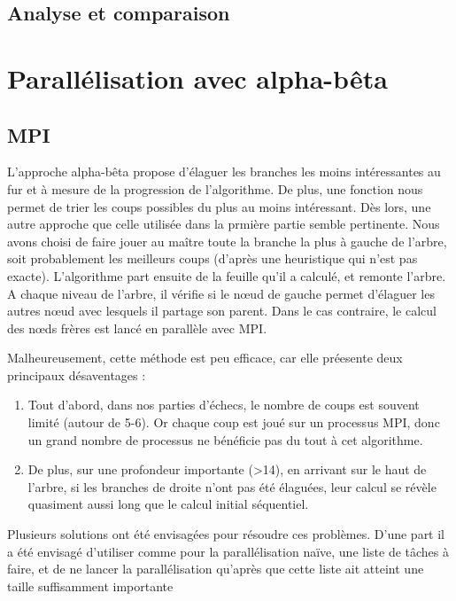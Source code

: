 \documentclass[12pt]{article}
\begin{document}
    \subsection{Analyse et comparaison}

\section{Parallélisation avec alpha-bêta}
    \subsection{MPI}
    L'approche alpha-bêta propose d'élaguer les branches
    les moins intéressantes au fur et à mesure de la progression de 
    l'algorithme. De plus, une fonction nous permet de trier les coups
    possibles du plus au moins intéressant. Dès lors, une autre 
    approche que celle utilisée dans la prmière partie semble pertinente.
    Nous avons choisi de faire jouer au
    maître toute la branche la plus à gauche de l'arbre, soit
    probablement les meilleurs coups (d'après une heuristique qui n'est pas 
    exacte). L'algorithme part ensuite de la feuille qu'il a calculé, et
    remonte l'arbre. A chaque niveau de l'arbre, il vérifie si le n\oe ud de 
    gauche permet d'élaguer les autres n\oe ud avec lesquels il partage
    son parent. Dans le cas contraire, le calcul des \og n\oe ds frères \fg
    est lancé en parallèle avec MPI.\\
    \par Malheureusement, cette méthode est peu efficace, car elle préesente
    deux principaux désaventages :
    \begin{enumerate}
        \item Tout d'abord, dans nos parties d'échecs, le nombre
    de coups est souvent limité (autour de 5-6). Or chaque coup est joué sur un
    processus MPI, donc un grand nombre de processus ne bénéficie pas du tout
    à cet algorithme.
        \item De plus, sur une profondeur importante (>14),
    en arrivant sur le haut de l'arbre, si les branches de droite n'ont pas
    été élaguées, leur calcul se révèle quasiment aussi long que le calcul
    initial séquentiel. 
    \end{enumerate}
    Plusieurs solutions ont été envisagées pour résoudre ces problèmes.
    D'une part il a été envisagé d'utiliser comme pour la parallélisation
    naïve, une liste de tâches à faire, et de ne lancer la parallélisation
    qu'après que cette liste ait atteint une taille suffisamment importante
\end{document}
